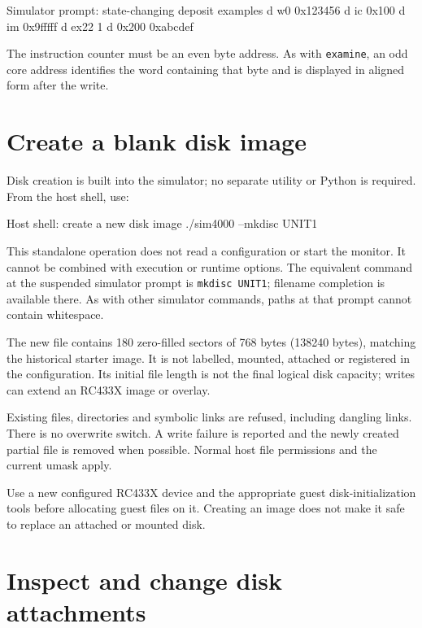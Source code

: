 \begin{commandexample}{Simulator prompt: state-changing deposit examples}
d w0 0x123456
d ic 0x100
d im 0x9fffff
d ex22 1
d 0x200 0xabcdef
\end{commandexample}

The instruction counter must be an even byte address. As with \passthrough{\lstinline!examine!}, an odd core address identifies the word containing that byte and is displayed in aligned form after the write.

\section{Create a blank disk image}\label{create-a-blank-disk-image}

Disk creation is built into the simulator; no separate utility or Python is
required. From the host shell, use:

\begin{commandexample}[language=sh]{Host shell: create a new disk image}
./sim4000 --mkdisc UNIT1
\end{commandexample}

This standalone operation does not read a configuration or start the monitor.
It cannot be combined with execution or runtime options. The equivalent
command at the suspended simulator prompt is \texttt{mkdisc UNIT1}; filename
completion is available there. As with other simulator commands, paths at
that prompt cannot contain whitespace.

The new file contains 180 zero-filled sectors of 768 bytes (138240 bytes),
matching the historical starter image. It is not labelled, mounted, attached
or registered in the configuration. Its initial file length is not the final
logical disk capacity; writes can extend an RC433X image or overlay.

Existing files, directories and symbolic links are refused, including dangling
links. There is no overwrite switch. A write failure is reported and the newly
created partial file is removed when possible. Normal host file permissions
and the current umask apply.

Use a new configured RC433X device and the appropriate guest disk-initialization
tools before allocating guest files on it. Creating an image does not make
it safe to replace an attached or mounted disk.

\section{Inspect and change disk attachments}\label{inspect-and-change-disk-attachments}

